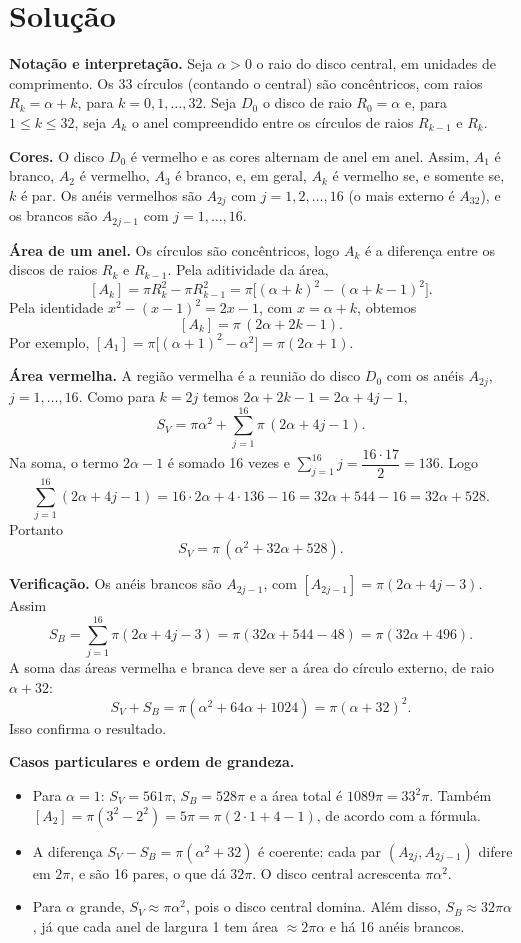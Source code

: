 \documentclass{article}%
\begin{document}
\section*{Solução}

\textbf{Notação e interpretação.} Seja $\alpha>0$ o raio do disco central, em unidades de comprimento. Os 33 círculos (contando o central) são concêntricos, com raios $R_k=\alpha+k$, para $k=0,1,\ldots,32$. Seja $D_0$ o disco de raio $R_0=\alpha$ e, para $1\leq k\leq 32$, seja $A_k$ o anel compreendido entre os círculos de raios $R_{k-1}$ e $R_k$.

\textbf{Cores.} O disco $D_0$ é vermelho e as cores alternam de anel em anel. Assim, $A_1$ é branco, $A_2$ é vermelho, $A_3$ é branco, e, em geral, $A_k$ é vermelho se, e somente se, $k$ é par. Os anéis vermelhos são $A_{2j}$ com $j=1,2,\ldots,16$ (o mais externo é $A_{32}$), e os brancos são $A_{2j-1}$ com $j=1,\ldots,16$.

\textbf{Área de um anel.} Os círculos são concêntricos, logo $A_k$ é a diferença entre os discos de raios $R_k$ e $R_{k-1}$. Pela aditividade da área,
\[
[A_k]=\pi R_k^2-\pi R_{k-1}^2=\pi\big[(\alpha+k)^2-(\alpha+k-1)^2\big].
\]
Pela identidade $x^2-(x-1)^2=2x-1$, com $x=\alpha+k$, obtemos
\[
[A_k]=\pi\,(2\alpha+2k-1).
\]
Por exemplo, $[A_1]=\pi\big[(\alpha+1)^2-\alpha^2\big]=\pi(2\alpha+1)$.

\textbf{Área vermelha.} A região vermelha é a reunião do disco $D_0$ com os anéis $A_{2j}$, $j=1,\ldots,16$. Como para $k=2j$ temos $2\alpha+2k-1=2\alpha+4j-1$,
\[
S_V=\pi\alpha^2+\sum_{j=1}^{16}\pi\,(2\alpha+4j-1).
\]
Na soma, o termo $2\alpha-1$ é somado 16 vezes e $\sum_{j=1}^{16} j=\dfrac{16\cdot 17}{2}=136$. Logo
\[
\sum_{j=1}^{16}(2\alpha+4j-1)=16\cdot 2\alpha+4\cdot 136-16=32\alpha+544-16=32\alpha+528.
\]
Portanto
\[
S_V=\pi\,(\alpha^2+32\alpha+528).
\]

\textbf{Verificação.} Os anéis brancos são $A_{2j-1}$, com $[A_{2j-1}]=\pi(2\alpha+4j-3)$. Assim
\[
S_B=\sum_{j=1}^{16}\pi(2\alpha+4j-3)=\pi(32\alpha+544-48)=\pi(32\alpha+496).
\]
A soma das áreas vermelha e branca deve ser a área do círculo externo, de raio $\alpha+32$:
\[
S_V+S_B=\pi(\alpha^2+64\alpha+1024)=\pi(\alpha+32)^2.
\]
Isso confirma o resultado.

\textbf{Casos particulares e ordem de grandeza.}
\begin{itemize}
\item Para $\alpha=1$: $S_V=561\pi$, $S_B=528\pi$ e a área total é $1089\pi=33^2\pi$. Também $[A_2]=\pi(3^2-2^2)=5\pi=\pi(2\cdot 1+4-1)$, de acordo com a fórmula.
\item A diferença $S_V-S_B=\pi(\alpha^2+32)$ é coerente: cada par $(A_{2j},A_{2j-1})$ difere em $2\pi$, e são 16 pares, o que dá $32\pi$. O disco central acrescenta $\pi\alpha^2$.
\item Para $\alpha$ grande, $S_V\approx\pi\alpha^2$, pois o disco central domina. Além disso, $S_B\approx 32\pi\alpha$, já que cada anel de largura 1 tem área $\approx 2\pi\alpha$ e há 16 anéis brancos.
\end{itemize}
\end{document}
